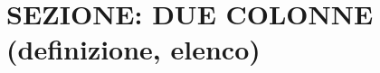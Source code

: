 \documentclass[aspectratio=1610]{beamer}
\begin{document}

\section{SEZIONE: DUE COLONNE (definizione, elenco)}

\end{document}
